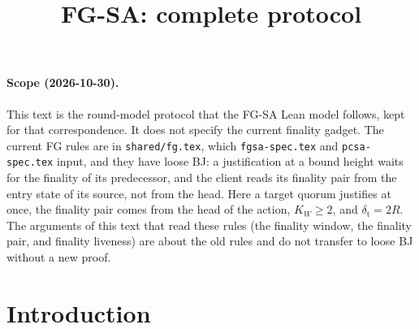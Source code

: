 \documentclass{article}
\title{FG-SA: complete protocol}
\author{}
\date{}
\theoremstyle{plain}
\theoremstyle{definition}
\theoremstyle{remark}
\begin{document}
\maketitle

\paragraph{Scope (2026-10-30).}  This text is the round-model protocol
that the FG-SA Lean model follows, kept for that correspondence.  It does
not specify the current finality gadget.  The current FG rules are in
\texttt{shared/fg.tex}, which \texttt{fgsa-spec.tex} and
\texttt{pcsa-spec.tex} input, and they have loose BJ: a justification at
a bound height waits for the finality of its predecessor, and the client
reads its finality pair from the entry state of its source, not from the
head.  Here a target quorum justifies at once, the finality pair comes
from the head of the action, $K_W\geq2$, and $\delta_{\mathrm t}=2R$.  The
arguments of this text that read these rules (the finality window, the
finality pair, and finality liveness) are about the old rules and do not
transfer to loose BJ without a new proof.

\section{Introduction}\label{sec:intro}
\end{document}
